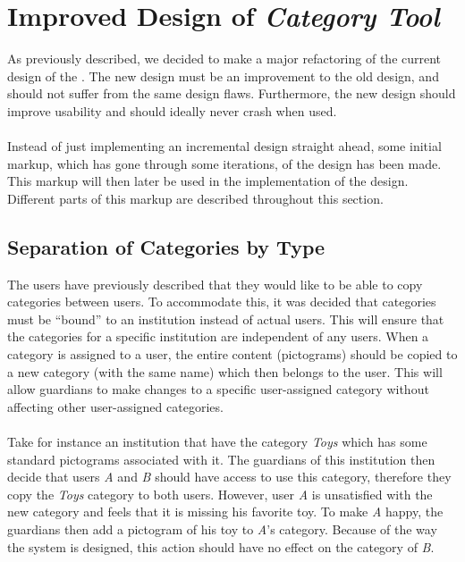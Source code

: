 \section{Improved Design of \emph{Category Tool}}
\label{sec:improved_design}

As previously described, we decided to make a major refactoring of the current design of the \ct. The new design must be an improvement to the old design, and should not suffer from the same design flaws. Furthermore, the new design should improve usability and should ideally never crash when used.
\\\\
Instead of just implementing an incremental design straight ahead, some initial markup, which has gone through some iterations, of the design has been made. This markup will then later be used in the implementation of the design. Different parts of this markup are described throughout this section.

\subsection{Separation of Categories by Type}
The users have previously described that they would like to be able to copy categories between users. To accommodate this, it was decided that categories must  be ``bound'' to an institution instead of actual users. This will ensure that the categories for a specific institution are independent of any users. When a category is assigned to a user, the entire content (pictograms) should be copied to a new category (with the same name) which then belongs to the user. This will allow guardians to make changes to a specific user-assigned category without affecting other user-assigned categories. 
\\\\
Take for instance an institution that have the category \emph{Toys} which has some standard pictograms associated with it. The guardians of this institution then decide that users \emph{A} and \emph{B} should have access to use this category, therefore they copy the \emph{Toys} category to both users. However, user \emph{A} is unsatisfied with the new category and feels that it is missing his favorite toy. To make \emph{A} happy, the guardians then add a pictogram of his toy to \emph{A}'s category. Because of the way the system is designed, this action should have no effect on the category of \emph{B}. \\

